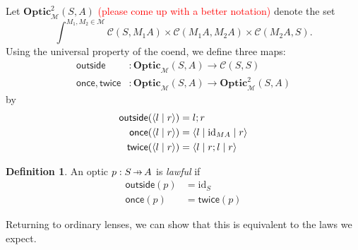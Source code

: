 \documentclass[11pt,letterpaper]{article}
\theoremstyle{plain}
\theoremstyle{definition}
\newtheorem{definition}[theorem]{Definition}
\newcommand{\C}{\mathscr{C}}
\newcommand{\M}{\mathscr{M}}
\newcommand{\Optic}{\mathbf{Optic}}
\newcommand{\Twoptic}{\mathbf{Optic}^2}
\newcommand{\id}{\mathrm{id}}
\newcommand{\rep}[2]{{\ensuremath \left\langle #1 \mid #2 \right\rangle}}
\newcommand{\repthree}[3]{{\ensuremath \langle #1 \mid #2 \mid #3 \rangle}}
\newcommand{\outside}{\mathsf{outside}}
\newcommand{\once}{\mathsf{once}}
\newcommand{\twice}{\mathsf{twice}}
\newcommand{\hto}{\ensuremath{\,\mathaccent\shortmid\rightarrow\,}}
\newcommand{\todo}[1]{\textcolor{red}{\small #1}}
\begin{document}
Let $\Twoptic_\M(S, A)$ \todo{(please come up with a better notation)} denote the set \[ \int^{M_1, M_2 \in \M} \C(S, M_1 A) \times \C(M_1 A, M_2 A) \times \C(M_2 A, S). \]
Using the universal property of the coend, we define three maps:
\begin{align*}
  \outside &: \Optic_\M(S, A) \to \C(S, S) \\
  \once, \twice &: \Optic_\M(S, A) \to \Twoptic_\M(S, A)
\end{align*}
by
\begin{align*}
  \outside(\rep{l}{r}) &= l;r \\
  \once(\rep{l}{r}) &= \repthree{l}{\id_{MA}}{r} \\
  \twice(\rep{l}{r}) &= \repthree{l}{r;l}{r}
\end{align*}

\begin{definition}
  An optic $p : S \hto A$ is \emph{lawful} if
  \begin{align*}
    \outside(p) &= \id_S \\
    \once(p) &= \twice(p)
  \end{align*}
\end{definition}

Returning to ordinary lenses, we can show that this is equivalent to the laws we expect.
\end{document}
